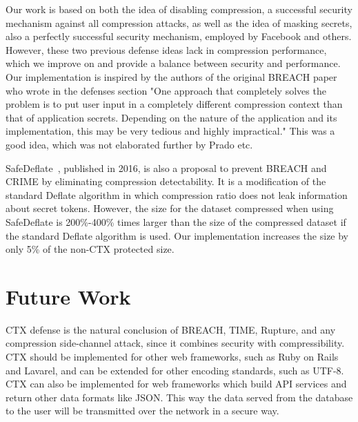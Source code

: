 \documentclass[a4paper, 11 pt, conference]{article}  %
\begin{document}
Our work is based on both the idea of disabling compression, a successful
security mechanism against all compression attacks, as well as the idea of
masking secrets, also a perfectly successful security mechanism, employed by
Facebook and others. However, these two previous defense ideas lack in
compression performance, which we improve on and provide a balance between
security and performance. Our implementation is inspired by the authors of the original BREACH paper who wrote in the defenses section "One approach that completely solves the problem is to put user input in a completely different compression context than that of application secrets. Depending on the nature of the application and its implementation, this may be very tedious and highly impractical." This was a good idea, which was not elaborated further by Prado etc.

SafeDeflate~\cite{c16}, published in 2016, is also a proposal to prevent BREACH
and CRIME by eliminating compression detectability. It is a modification of the
standard Deflate algorithm in which compression ratio does not leak information
about secret tokens. However, the size for the dataset compressed when using
SafeDeflate is 200\%-400\% times larger than the size of the compressed dataset if the
standard Deflate algorithm is used. Our implementation increases the size by only 5\% of the non-CTX protected size.

\section{Future Work}
CTX defense is the natural conclusion of BREACH, TIME, Rupture, and any
compression side-channel attack, since it combines security with
compressibility. CTX should be implemented for other web frameworks, such as
Ruby on Rails and Lavarel, and can be extended for other encoding standards,
such as UTF-8. CTX can also be implemented for web frameworks which build API
services and return other data formats like JSON. This way the data served from
the database to the user will be transmitted over the network in a secure way.
\end{document}
